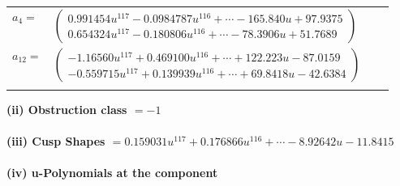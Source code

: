 \documentclass[1p]{elsarticle_modified}
\theoremstyle{definition}
\begin{document}
\begin{tabular}{m{7pt} m{180pt} m{7pt} m{180pt} }
\flushright $a_{4}=$&$\begin{pmatrix}0.991454 u^{117}-0.0984787 u^{116}+\cdots-165.840 u+97.9375\\0.654324 u^{117}-0.180806 u^{116}+\cdots-78.3906 u+51.7689\end{pmatrix}$ \\
\flushright $a_{12}=$&$\begin{pmatrix}-1.16560 u^{117}+0.469100 u^{116}+\cdots+122.223 u-87.0159\\-0.559715 u^{117}+0.139939 u^{116}+\cdots+69.8418 u-42.6384\end{pmatrix}$\\&\end{tabular}
\flushleft \textbf{(ii) Obstruction class $= -1$}\\~\\
\flushleft \textbf{(iii) Cusp Shapes $= 0.159031 u^{117}+0.176866 u^{116}+\cdots-8.92642 u-11.8415$}\\~\\
\newpage\renewcommand{\arraystretch}{1}
\flushleft \textbf{(iv) u-Polynomials at the component}\newline \\
\end{document}
